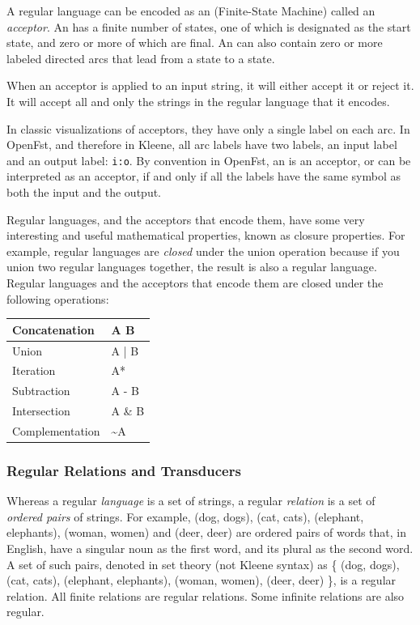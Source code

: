 A regular language can be encoded as an \fsm{} (Finite-State Machine) called an
\emph{acceptor}.  An \fsm{} has a finite number of states, one of which is designated as the
start state, and zero or more of which are final.  An \fsm{} can also contain zero or
more labeled directed arcs that lead from a state to a state.

When an acceptor is applied to an input string, it will either accept it or reject it.  It
will accept all and only the strings in the regular language that it encodes.

In classic visualizations of acceptors, they have only a single label on
each arc.  In OpenFst, and therefore in Kleene, all arc labels have two labels, an input
label and an output label: \verb!i:o!.  By convention in OpenFst, an \fsm{} is an acceptor,
or can be interpreted as an acceptor,
if and only if all the labels have the same symbol as both the input and the output.

Regular languages, and the acceptors that encode them, have some very interesting and
useful
mathematical properties, known as closure properties.  For example, regular languages are
\emph{closed} under the union operation because if you union two regular languages together, the
result is also a regular language.  Regular languages and the acceptors that
encode them are closed under the following
operations:

\vspace{4mm}

\begin{tabular}{|l|l|}
\hline
Concatenation 	& A B \\
\hline
Union         	& A | B \\
\hline
Iteration	  	& A*\\
\hline
Subtraction		& A - B\\
\hline
Intersection	& A \& B\\
\hline
Complementation		& \~{}A\\
\hline
\end{tabular}

\subsubsection{Regular Relations and Transducers}

Whereas a regular \emph{language} is a set of strings, a regular \emph{relation}
is a set of
\emph{ordered pairs}
of strings.  For example, (dog, dogs), (cat, cats), (elephant, elephants), (woman, women)
and (deer, deer)
are ordered pairs of words that, in English, have a singular noun as the first word, and its plural
as the second word.  A set of such pairs, denoted in set theory (not Kleene syntax) as \{ (dog, dogs), (cat, cats), (elephant,
elephants), (woman, women), (deer, deer) \}, is a regular relation.  All finite relations are
regular relations.  Some infinite relations are also regular.

